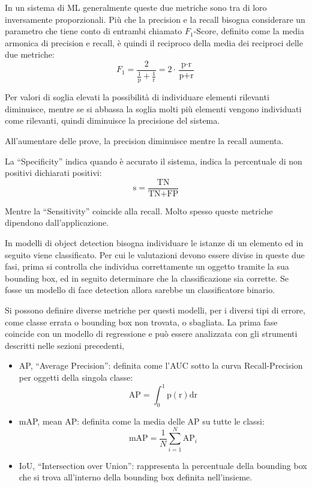 \documentclass{article}
\numberwithin{equation}{subsection}
\begin{document}
In un sistema di ML generalmente queste due metriche sono tra di loro inversamente proporzionali. Più che la precision e la recall bisogna considerare un parametro che tiene conto di entrambi chiamato $F_1$-Score, definito come la media armonica di precision e recall, è quindi il reciproco della media dei reciproci delle due metriche:
\begin{equation}
    F_1=\displaystyle\frac{2}{\frac{1}{\text{p}}+\frac{1}{\text{r}}}=2\cdot\frac{\text{p}\cdot\text{r}}{\text{p}+\text{r}}
\end{equation}

Per valori di soglia elevati la possibilità di individuare elementi rilevanti diminuisce, mentre se si abbassa la soglia molti più elementi vengono individuati come rilevanti, quindi 
diminuisce la precisione del sistema. 

All'aumentare delle prove, la precision diminuisce mentre la recall aumenta. 

La ``Specificity'' indica quando è accurato il sistema, indica la percentuale di non 
positivi dichiarati positivi:
\begin{equation}
    \text{s}=\displaystyle\frac{\text{TN}}{\text{TN}+\text{FP}}
\end{equation}

Mentre la ``Sensitivity'' coincide alla recall. 
Molto spesso queste metriche dipendono dall'applicazione. 

In modelli di object detection bisogna individuare le istanze di un elemento ed in seguito 
viene classificato. Per cui le valutazioni devono essere divise in queste due fasi, prima si controlla che individua correttamente un oggetto tramite la sua bounding box, ed in seguito determinare che la classificazione sia corrette. 
Se fosse un modello di face detection allora sarebbe un classificatore binario. 

Si possono definire diverse metriche per questi modelli, per i diversi tipi di errore, come 
classe errata o bounding box non trovata, o sbagliata. La prima fase coincide con un modello di regressione e può essere analizzata con gli strumenti descritti nelle sezioni precedenti, 
\begin{itemize}
    \item AP, ``Average Precision'': definita come l'AUC sotto la curva Recall-Precision per oggetti della singola classe:
    \begin{equation}
        \text{AP}=\displaystyle\int_0^1\text{p}(\text{r})\text{dr}
    \end{equation}
    \item mAP, mean AP: definita come la media delle AP su tutte le classi:
    \begin{equation}
        \text{mAP}=\displaystyle\frac{1}{N}\sum_{i=1}^N\text{AP}_i
    \end{equation}
    \item IoU, ``Intersection over Union'': rappresenta la percentuale della bounding box che si trova all'interno della bounding box definita nell'insieme.  
\end{itemize}
\end{document}
